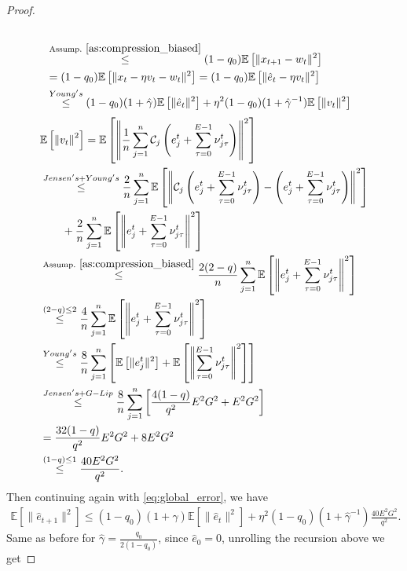 \documentclass{article} %
\DeclareMathOperator{\E}{\E}
\def\C{{\mathcal C}}
\def\E{{\mathbb E}}
\begin{document}
\begin{proof}
\begin{align}
\begin{aligned}
        \\
        & \overset{\text{Assump.}~\ref{as:compression_biased}}{\leq}(1-q_0)\E\left[\|x_{t+1} -w_t\|^2\right]
        \\
        &=(1-q_0)\E\left[\|x_{t} -\eta v_t -w_t\|^2\right] = (1-q_0)\E\left[\|\hat{e}_t -\eta v_t\|^2\right]
        \\
        &\overset{Young's}{\leq}(1-q_0)(1+\hat{\gamma})\E\left[\|\hat{e}_t\|^2\right] + \eta^2(1-q_0)(1+\hat{\gamma}^{-1})\E\left[\|v_t\|^2\right]
    \end{aligned}
\end{align}
\begin{align*}
    &\E\left[\left\|v_t\right\|^2\right] = \E\left[\left\|\frac{1}{n}\sum_{j=1}^n\C_j\left(e_j^t + \sum_{\tau=0}^{E-1}\nu_{j\tau}^t\right)\right\|^2\right]
    \\
    &\overset{Jensen's+ Young's}{\leq} \frac{2}{n}\sum_{j=1}^n\E\left[\left\|\C_j\left(e_j^t + \sum_{\tau=0}^{E-1}\nu_{j\tau}^t\right) - \left(e_j^t + \sum_{\tau=0}^{E-1}\nu_{j\tau}^t\right) \right\|^2\right] 
    \\
    &\qquad + \frac{2}{n}\sum_{j=1}^n\E\left[\left\|e_j^t + \sum_{\tau=0}^{E-1}\nu_{j\tau}^t\right\|^2\right]
    \\
    &\overset{\text{Assump.}~\ref{as:compression_biased}}{\leq}\frac{2(2-q)}{n}\sum_{j=1}^n\E\left[\left\|e_j^t + \sum_{\tau=0}^{E-1}\nu_{j\tau}^t\right\|^2\right]
    \\
    &\overset{(2-q)\leq2}{\leq} \frac{4}{n}\sum_{j=1}^n\E\left[\left\|e_j^t + \sum_{\tau=0}^{E-1}\nu_{j\tau}^t\right\|^2\right]
    \\
    &\overset{Young's}{\leq}\frac{8}{n}\sum_{j=1}^n\left[\E\left[\|e_j^t\|^2\right]+ \E\left[\left\|\sum_{\tau=0}^{E-1}\nu_{j\tau}^t\right\|^2\right]\right]
    \\
    &\overset{Jensen's+G-Lip}{\leq}\frac{8}{n}\sum_{j=1}^n\left[\frac{4(1-q)}{ q^2}E^2G^2 + E^2G^2\right]
    \\
    &=\frac{32(1-q)}{ q^2}E^2G^2 + 8E^2G^2
    \\
    &\overset{(1-q)\leq1}{\leq}\frac{40 E^2G^2}{ q^2}.
\end{align*}
Then continuing again with \ref{eq:global_error}, we have
\begin{align*}
    \E[\|\hat{e}_{t+1}\|^2] \leq (1-q_0)(1+\hat{\gamma})\E\left[\|\hat{e}_t\|^2\right] + \eta^2(1-q_0)(1+\hat{\gamma}^{-1})\frac{40 E^2G^2}{ q^2}.
\end{align*}
Same as before for $\hat{\gamma} =\frac{q_0}{2(1-q_0)} $, since $\hat{e}_0 = 0$, unrolling the recursion above we get

\end{proof}
\end{document}
